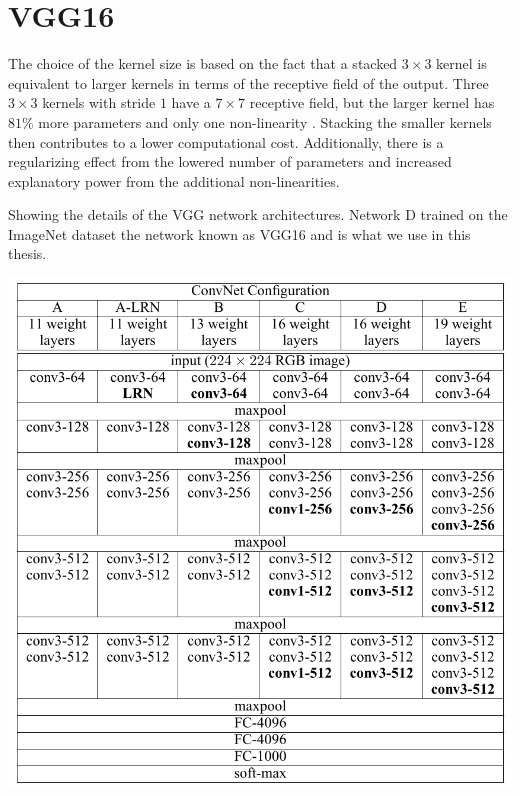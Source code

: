 \documentclass[preprint,12pt]{elsarticle}
\begin{document}
\section{VGG16}\label{app:vgg}
The choice of the kernel size is based on the fact that a stacked $3 \times 3$ kernel is equivalent to larger kernels in terms of the receptive field of the output. Three $3 \times 3$ kernels with stride $1$ have a $7 \times 7$ receptive field, but the larger kernel has $81\%$ more parameters and only one non-linearity \cite{Simonyan2014}. Stacking the smaller kernels then contributes to a lower computational cost. Additionally, there is a regularizing effect from the lowered number of parameters and increased explanatory power from the additional non-linearities.
\begin{table}
\caption[vgg architectures]{Showing the details of the VGG network architectures. Network D trained on the ImageNet \cite{Russakovsky2015} dataset the network known as  VGG16 and is what we use in this thesis.}\label{tab:vgg}
\includegraphics[width=\textwidth]{plots/vgg_architectures.png}
\end{table}


\end{document}
